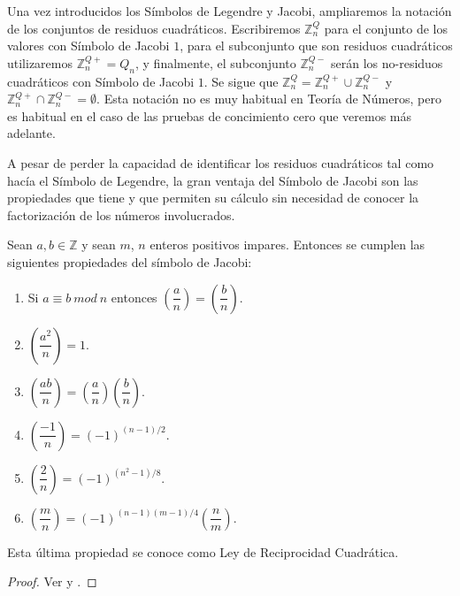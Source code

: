 \begin{remark}
	Una vez introducidos los S\'imbolos de Legendre y Jacobi, ampliaremos la notaci\'on de los
	conjuntos de residuos cuadráticos. Escribiremos $\mathbb{Z}_n^Q$ para el conjunto de los 
	valores con S\'imbolo de Jacobi $1$, para el subconjunto que son residuos cuadr\'aticos
	utilizaremos $\mathbb{Z}_n^{Q+} = Q_n$, y finalmente, el subconjunto $\mathbb{Z}_n^{Q-}$
	ser\'an los no-residuos cuadr\'aticos con S\'imbolo de Jacobi $1$. Se sigue que 
	$\mathbb{Z}_n^Q = \mathbb{Z}_n^{Q+} \cup \mathbb{Z}_n^{Q-}$ y 
	$\mathbb{Z}_n^{Q+} \cap \mathbb{Z}_n^{Q-} = \emptyset $. 
	Esta notaci\'on no es muy habitual en Teor\'ia de N\'umeros, pero es habitual en el caso de las
	pruebas de concimiento cero que veremos m\'as adelante.
\end{remark}

A pesar de perder la capacidad de identificar los residuos cuadr\'aticos tal como hacía el S\'imbolo de Legendre, la gran ventaja del S\'imbolo de Jacobi son las
propiedades que tiene y que permiten su c\'alculo sin necesidad de conocer la factorizaci\'on de los n\'umeros involucrados.

\begin{proposition}
Sean $a,b \in {\mathbb Z}$ y sean $m$, $n$ enteros positivos impares. Entonces se cumplen las siguientes propiedades del s\'imbolo de Jacobi:
\begin{enumerate}
\item Si $a\equiv b~mod~n$ entonces $\left( \dfrac{a}{n} \right) = \left( \dfrac{b}{n} \right)$.
\item $\left( \dfrac{a^2}{n} \right) = 1$.
\item $\left( \dfrac{ab}{n} \right) = \left( \dfrac{a}{n} \right)\left( \dfrac{b}{n} \right)$.
\item $\left( \dfrac{-1}{n} \right) = (-1)^{(n-1)/2}$.
\item $\left( \dfrac{2}{n} \right) = (-1)^{(n^2-1)/8}$.
\item $\left( \dfrac{m}{n} \right) = (-1)^{(n-1)(m-1)/4} \left( \dfrac{n}{m} \right)$.
\end{enumerate}
Esta \'ultima propiedad se conoce como Ley de Reciprocidad Cuadr\'atica.
\end{proposition}
\begin{proof}
Ver \cite[Proposition 2.13]{Pardo} y \cite[Theorem 2.24]{Pardo}.
\end{proof}

